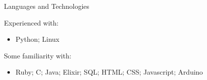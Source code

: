 \documentclass[]{mcdowellcv}
\begin{document}
    \begin{cvsection}{Languages and Technologies}
        \begin{cvsubsection}{}{}{}
            Experienced with:
            \begin{itemize}
                \item Python; Linux
            \end{itemize}
            Some familiarity with:
            \begin{itemize}
                \item Ruby; C; Java; Elixir; SQL; HTML; CSS; Javascript; Arduino
            \end{itemize}
        \end{cvsubsection}
    \end{cvsection}
\end{document}
